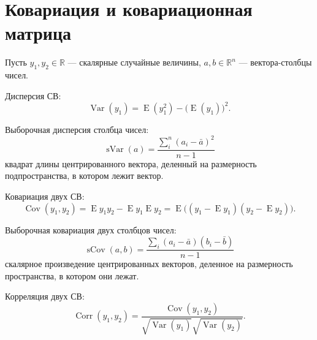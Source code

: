 \documentclass[12pt]{article} %
\theoremstyle{definition} %
\DeclareMathOperator{\Cov}{Cov}
\DeclareMathOperator{\sCov}{sCov}
\DeclareMathOperator{\sVar}{sVar}
\DeclareMathOperator{\Corr}{Corr}
\DeclareMathOperator{\Var}{Var}
\DeclareMathOperator{\E}{E}
\def \RR{\mathbb{R}}
\begin{document}
\section{Ковариация и ковариационная матрица}
Пусть \(y_1, y_2 \in \RR\) — скалярные случайные величины,
\(a, b \in \RR^n\) — вектора-столбцы чисел.


Дисперсия СВ:
\[ \Var(y_1) = \E(y_1^2) - \big( \E(y_1) \big)^2. \]

Выборочная дисперсия столбца чисел:
\[ \sVar(a) = \frac{\sum_{i}^n (a_i - \bar{a})^2}{n-1} \]
квадрат длины центрированного вектора, деленный на размерность подпространства, в котором лежит вектор.

Ковариация двух СВ:
\[ \Cov(y_1, y_2) = \E y_1 y_2 - \E y_1 \E y_2= \E \bigg( (y_1 - \E y_1) (y_2 - \E y_2) \bigg).\]

Выборочная ковариация двух столбцов чисел:
\[ \sCov(a, b) = \frac{\sum_i (a_{i} - \bar{a}) (b_{i} - \bar{b})}{n-1}\]
скалярное произведение центрированных векторов, деленное на размерность пространства, в котором они лежат.

Корреляция двух СВ:
\[ \Corr(y_1, y_2) = \frac{\Cov(y_1, y_2)}
{\sqrt{\Var(y_1)} \sqrt{\Var(y_2)} }. \]
\end{document}
